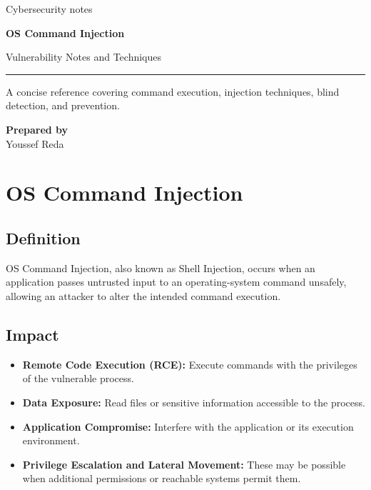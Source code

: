 \documentclass[12pt,a4paper]{article}
\newcommand{\nsection}[1]{\section{#1}}
\newcommand{\nsubsection}[1]{\subsection{#1}}
\begin{document}
\begin{titlepage}
    \centering
    \vspace*{2cm}

    {\Large\textcolor{secondary}{Cybersecurity notes}\par}
    \vspace{1.1cm}

    {\Huge\bfseries\textcolor{primary}{OS Command Injection}\par}
    \vspace{0.5cm}

    {\Large Vulnerability Notes and Techniques\par}
    \vspace{1.5cm}

    \rule{0.8\textwidth}{1pt}
    \vspace{1cm}

    {\large
        A concise reference covering command execution,
        injection techniques, blind detection, and prevention.
        \par}

    \vfill

    \begin{flushleft}
        \centering
        \textbf{Prepared by}\\
        \vspace{0.3cm}
        Youssef Reda
    \end{flushleft}
\end{titlepage}

\tableofcontents
\newpage

\nsection{OS Command Injection}

\vspace{0.5cm}
\nsubsection{Definition}

OS Command Injection, also known as Shell Injection, occurs
when an application passes untrusted input to an operating-system
command unsafely, allowing an attacker to alter the intended
command execution.

\vspace{0.5cm}
\nsubsection{Impact}

\begin{itemize}
    \item \textbf{Remote Code Execution (RCE):}
          Execute commands with the privileges of the vulnerable process.
    \item \textbf{Data Exposure:}
          Read files or sensitive information accessible to the process.
    \item \textbf{Application Compromise:}
          Interfere with the application or its execution environment.
    \item \textbf{Privilege Escalation and Lateral Movement:}
          These may be possible when additional permissions or reachable
          systems permit them.
\end{itemize}
\end{document}
